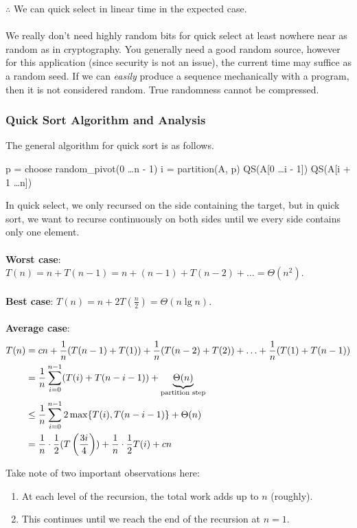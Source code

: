 \documentclass[]{article}
\theoremstyle{definition}
\DeclarePairedDelimiter{\set}{\lbrace}{\rbrace}
\begin{document}
				$\therefore$ We can quick select in linear time in the expected case.
				\\ \\
				We really don't need highly random bits for quick select \textendash{} at least nowhere near as random as in cryptography. You generally need a good random source, however for this application (since security is not an issue), the current time may suffice as a random seed. If we can \emph{easily} produce a sequence mechanically with a program, then it is not considered random. True randomness cannot be compressed.
			\subsubsection{Quick Sort Algorithm and Analysis}
				The general algorithm for quick sort is as follows. \\
				\begin{algorithm}[H]
					p = choose random\_pivot(0 \ldots n - 1)\;
					i = partition(A, p)\;
					QS(A[0 \ldots i - 1])\;
					QS(A[i + 1 \ldots n])\;
				\end{algorithm}

				In quick select, we only recursed on the side containing the target, but in quick sort, we want to recurse continuously on both sides until we every side contains only one element.
				\\ \\
				\textbf{Worst case}: $T(n) = n + T(n - 1) = n + (n - 1) + T(n - 2) + \ldots = \Theta(n^2)$.
				\\ \\
				\textbf{Best case}: $T(n) = n + 2T\left(\frac{n}{2}\right) = \Theta(n \lg n)$.
				\\ \\
				\textbf{Average case}:
				\begin{align*}
					T(n) &= cn + \frac{1}{n}(T(n - 1) + T(1)) + \frac{1}{n}(T(n - 2) + T(2)) + \ldots + \frac{1}{n}(T(1) + T(n - 1)) \\
					&= \frac{1}{n} \sum_{i = 0}^{n - 1}(T(i) + T(n - i - 1)) + \underbrace{\Theta(n)}_{\text{partition step}} \\
					&\le \frac{1}{n} \sum_{i = 0}^{n - 1} 2 \max \set{T(i), T(n - i - 1) } + \Theta(n) \\
					&= \frac{1}{n} \cdot \frac{1}{2}(T\left(\frac{3i}{4}\right)) + \frac{1}{n} \cdot \frac{1}{2} T(i) + cn
				\end{align*}

				Take note of two important observations here:
				\begin{enumerate}
					\item At each level of the recursion, the total work adds up to $n$ (roughly).
					\item This continues until we reach the end of the recursion at $n = 1$.
				\end{enumerate}
\end{document}
